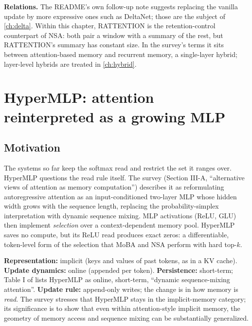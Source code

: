 \textbf{Relations.} The README's own follow-up note suggests replacing the vanilla update by
more expressive ones such as DeltaNet; those are the subject of \cref{ch:delta}. Within this
chapter, RATTENTION is the retention-control counterpart of NSA: both pair a window with a summary
of the rest, but RATTENTION's summary has constant size. In the survey's terms it sits between
attention-based memory and recurrent memory, a single-layer hybrid; layer-level hybrids are
treated in \cref{ch:hybrid}.

\section{HyperMLP: attention reinterpreted as a growing MLP}\label{sec:c04-hypermlp}

\subsection{Motivation}

The systems so far keep the softmax read and restrict the set it ranges over. HyperMLP
\citep{lu2026hypermlp} questions the read rule itself. The survey (Section III-A, ``alternative
views of attention as memory computation'') describes it as reformulating autoregressive attention
as an input-conditioned two-layer MLP whose hidden width grows with the sequence length, replacing
the probability-simplex interpretation with dynamic sequence mixing. MLP activations (ReLU, GLU)
then implement \emph{selection} over a context-dependent memory pool. HyperMLP saves no compute,
but its ReLU read produces exact zeros: a differentiable, token-level form of the selection that
MoBA and NSA perform with hard top-$k$.

\begin{taxonomy}
\textbf{Representation:} implicit (keys and values of past tokens, as in a KV cache).
\textbf{Update dynamics:} online (appended per token).
\textbf{Persistence:} short-term; Table I of \citet{zhoubian2026memory} lists HyperMLP as online,
short-term, ``dynamic sequence-mixing attention''.
\textbf{Update rule:} append-only writes; the change is in how memory is \emph{read}. The survey
stresses that HyperMLP stays in the implicit-memory category; its significance is to show that
even within attention-style implicit memory, the geometry of memory access and sequence mixing
can be substantially generalized.
\end{taxonomy}

